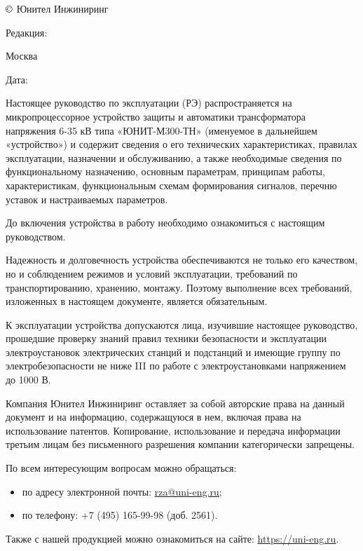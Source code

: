 \pagestyle{fancy}
\fancyhf{}
\renewcommand{\headrulewidth}{1pt}
\lhead{\color{black}{ЮТКБ.656122.609 РЭ5 Редакция \rev~от~\revdate}}
\rfoot{{\thepage}}
\renewcommand{\footrulewidth}{1pt}


\pagecolor{white}

\noindent
$\copyright$ \the\year{} Юнител Инжиниринг
\hfill
\parbox{0.3\textwidth}{\raggedleft Редакция: \textcolor{unigray}{\rev}}

\vskip 3mm
\noindent
Москва
\hfill
\parbox{0.3\textwidth}{\raggedleft Дата: \textcolor{unigray}{\revdate}}
\vskip 8mm

\vskip 10mm

\par
Настоящее руководство по эксплуатации (РЭ) распространяется на микропроцессорное устройство защиты и автоматики трансформатора напряжения 6-35 кВ типа «ЮНИТ-М300-ТН» (именуемое в дальнейшем «устройство») и содержит сведения о его технических характеристиках, правилах эксплуатации, назначении и обслуживанию, а также необходимые сведения по функциональному назначению, основным параметрам, принципам работы, характеристикам, функциональным схемам формирования сигналов, перечню уставок и настраиваемых параметров.
\medskip
\par
До включения устройства в работу необходимо ознакомиться с настоящим руководством.
\medskip
\par
Надежность и долговечность устройства обеспечиваются не только его качеством, но и соблюдением режимов и условий эксплуатации, требований по транспортированию, хранению, монтажу. Поэтому выполнение всех требований, изложенных в настоящем документе, является обязательным. 
\medskip
\par
К эксплуатации устройства допускаются лица, изучившие настоящее руководство, прошедшие проверку знаний правил техники безопасности и эксплуатации электроустановок электрических станций и подстанций и имеющие группу по электробезопасности не ниже III по работе с электроустановками напряжением до 1000 В.


\vskip 75mm
\par
Компания Юнител Инжиниринг оставляет за собой авторские права на данный документ и на информацию, содержащуюся в нем, включая права на использование патентов. Копирование, использование и передача информации третьим лицам без письменного разрешения компании категорически запрещены.

\vskip 10mm
\par
По всем интересующим вопросам можно обращаться:
\begin{itemize}
\item по адресу электронной почты: \href{mailto:rza@uni-eng.ru}{\color{uniblue}\uline{rza@uni-eng.ru}};
\item по телефону: +7 (495) 165-99-98 (доб. 2561).
\end{itemize}
Также с нашей продукцией можно ознакомиться на сайте: \href{https://uni-eng.ru}{\color{uniblue}\uline{https://uni-eng.ru}}.

